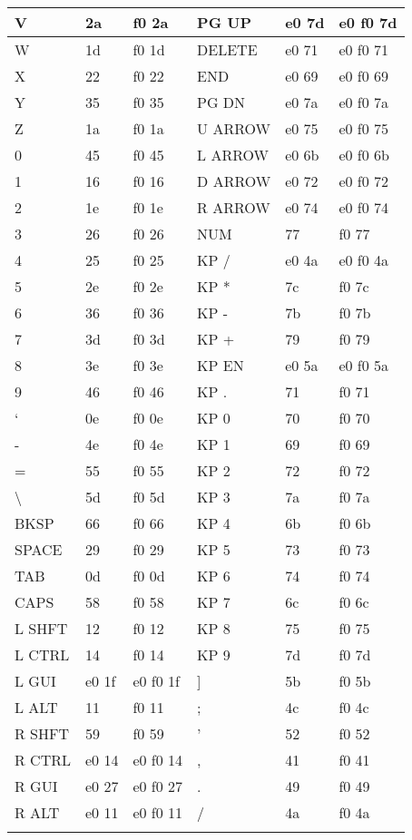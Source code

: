 \begin{longtable}{| p{} | p{} | p{} || p{} | p{} | p{} |}
  V & 2a & f0 2a & PG UP & e0 7d & e0 f0 7d \\ \hline
  W & 1d & f0 1d & DELETE & e0 71 & e0 f0 71 \\ \hline
  X & 22 & f0 22 & END & e0 69 & e0 f0 69 \\ \hline
  Y & 35 & f0 35 & PG DN & e0 7a & e0 f0 7a \\ \hline
  Z & 1a & f0 1a & U ARROW & e0 75 & e0 f0 75 \\ \hline
  0 & 45 & f0 45 & L ARROW & e0 6b & e0 f0 6b \\ \hline
  1 & 16 & f0 16 & D ARROW & e0 72 & e0 f0 72 \\ \hline
  2 & 1e & f0 1e & R ARROW & e0 74 & e0 f0 74 \\ \hline
  3 & 26 & f0 26 & NUM & 77 & f0 77 \\ \hline
  4 & 25 & f0 25 & KP / & e0 4a & e0 f0 4a \\ \hline
  5 & 2e & f0 2e & KP * & 7c & f0 7c \\ \hline
  6 & 36 & f0 36 & KP - & 7b & f0 7b \\ \hline
  7 & 3d & f0 3d & KP + & 79 & f0 79 \\ \hline
  8 & 3e & f0 3e & KP EN & e0 5a & e0 f0 5a \\ \hline
  9 & 46 & f0 46 & KP . & 71 & f0 71 \\ \hline
  ‘ & 0e & f0 0e & KP 0 & 70 & f0 70 \\ \hline
  - & 4e & f0 4e & KP 1 & 69 & f0 69 \\ \hline
  = & 55 & f0 55 & KP 2 & 72 & f0 72 \\ \hline
  \textbackslash & 5d & f0 5d & KP 3 & 7a & f0 7a \\ \hline
  BKSP & 66 & f0 66 & KP 4 & 6b & f0 6b \\ \hline
  SPACE & 29 & f0 29 & KP 5 & 73 & f0 73 \\ \hline
  TAB & 0d & f0 0d & KP 6 & 74 & f0 74 \\ \hline
  CAPS & 58 & f0 58 & KP 7 & 6c & f0 6c \\ \hline
  L SHFT & 12 & f0 12 & KP 8 & 75 & f0 75 \\ \hline
  L CTRL & 14 & f0 14 & KP 9 & 7d & f0 7d \\ \hline
  L GUI & e0 1f & e0 f0 1f & ] & 5b & f0 5b \\ \hline
  L ALT & 11 & f0 11 & ; & 4c & f0 4c \\ \hline
  R SHFT & 59 & f0 59 & ’ & 52 & f0 52 \\ \hline
  R CTRL & e0 14 & e0 f0 14 & , & 41 & f0 41 \\ \hline
  R GUI & e0 27 & e0 f0 27 & . & 49 & f0 49 \\ \hline
  R ALT & e0 11 & e0 f0 11 & / & 4a & f0 4a \\
  \hline
  \label{scancode_set_2}
\end{longtable}


